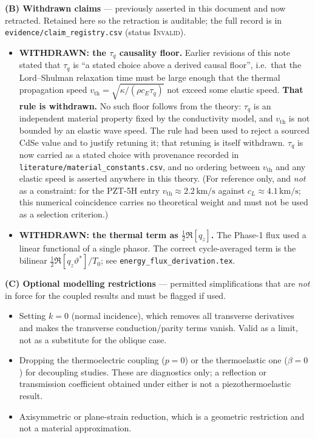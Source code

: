 \documentclass[11pt]{article}
\theoremstyle{plain}
\begin{document}
\medskip
\textbf{(B) Withdrawn claims} --- previously asserted in this document and now
retracted. Retained here so the retraction is auditable; the full record is in
\texttt{evidence/claim\_registry.csv} (status \textsc{Invalid}).
\begin{itemize}
  \item \textbf{WITHDRAWN: the $\tau_q$ causality floor.} Earlier revisions of
        this note stated that $\tau_q$ is ``a stated choice above a derived
        causal floor'', i.e.\ that the Lord--Shulman relaxation time must be
        large enough that the thermal propagation speed
        $v_{\mathrm{th}}=\sqrt{\kappa/(\rho c_E\tau_q)}$ not exceed some
        elastic speed. \textbf{That rule is withdrawn.} No such floor follows
        from the theory: $\tau_q$ is an independent material property fixed by
        the conductivity model, and $v_{\mathrm{th}}$ is not bounded by an
        elastic wave speed. The rule had been used to reject a sourced CdSe
        value and to justify retuning it; that retuning is itself withdrawn.
        $\tau_q$ is now carried as a stated choice with provenance recorded in
        \texttt{literature/material\_constants.csv}, and no ordering between
        $v_{\mathrm{th}}$ and any elastic speed is asserted anywhere in this
        theory. (For reference only, and \emph{not} as a constraint: for the
        PZT-5H entry $v_{\mathrm{th}}\approx2.2\,\mathrm{km/s}$ against
        $c_L\approx4.1\,\mathrm{km/s}$; this numerical coincidence carries no
        theoretical weight and must not be used as a selection criterion.)
  \item \textbf{WITHDRAWN: the thermal term as $\tfrac12\Re[q_z]$.} The Phase-1
        flux used a linear functional of a single phasor. The correct
        cycle-averaged term is the bilinear $\tfrac12\Re[q_z\vartheta^*]/T_0$;
        see \texttt{energy\_flux\_derivation.tex}.
\end{itemize}

\medskip
\textbf{(C) Optional modelling restrictions} --- permitted simplifications that
are \emph{not} in force for the coupled results and must be flagged if used.
\begin{itemize}
  \item Setting $k=0$ (normal incidence), which removes all transverse
        derivatives and makes the transverse conduction/parity terms vanish.
        Valid as a limit, not as a substitute for the oblique case.
  \item Dropping the thermoelectric coupling ($p=0$) or the thermoelastic one
        ($\beta=0$) for decoupling studies. These are diagnostics only; a
        reflection or transmission coefficient obtained under either is not a
        piezothermoelastic result.
  \item Axisymmetric or plane-strain reduction, which is a geometric restriction
        and not a material approximation.
\end{itemize}
\end{document}
